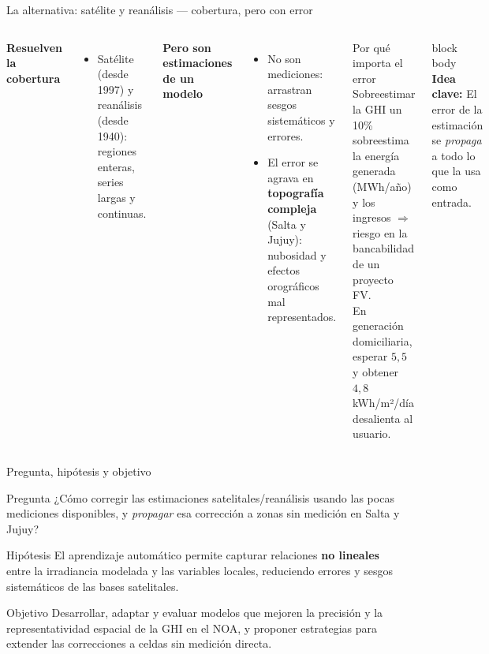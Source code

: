 \documentclass[aspectratio=169,11pt]{beamer}
\newcommand{\clave}[1]{%
  \begin{beamercolorbox}[wd=\linewidth,sep=6pt,rounded=true]{block body}%
    \footnotesize\textbf{\color{primary}Idea clave: }#1%
  \end{beamercolorbox}}
\begin{document}
\begin{frame}{La alternativa: satélite y reanálisis — cobertura, pero con error}
  \footnotesize
  \begin{columns}[T]
    \textbf{\color{teal}Resuelven la cobertura}
    \begin{itemize}
      \item Satélite (desde 1997) y reanálisis (desde 1940): regiones enteras, series largas y continuas.
    \end{itemize}
    \textbf{\color{accent}Pero son estimaciones de un modelo}
    \begin{itemize}
      \item No son mediciones: arrastran sesgos sistemáticos y errores.
      \item El error se agrava en \textbf{topografía compleja} (Salta y Jujuy): nubosidad y efectos orográficos mal representados.
    \end{itemize}
    \begin{block}{Por qué importa el error}
      \scriptsize
      Sobreestimar la GHI un 10\% sobreestima la energía generada (MWh/año) y los ingresos $\Rightarrow$ riesgo en la bancabilidad de un proyecto FV.\\[3pt]
      En generación domiciliaria, esperar $5{,}5$ y obtener $4{,}8$ kWh/m²/día desalienta al usuario.
    \end{block}
    \vspace{0.2em}
    \clave{El error de la estimación se \emph{propaga} a todo lo que la usa como entrada.}
  \end{columns}
\end{frame}

\begin{frame}{Pregunta, hipótesis y objetivo}
  \footnotesize
  \begin{block}{Pregunta}
    ¿Cómo corregir las estimaciones satelitales/reanálisis usando las pocas mediciones disponibles, y \emph{propagar} esa corrección a zonas sin medición en Salta y Jujuy?
  \end{block}
  \begin{block}{Hipótesis}
    El aprendizaje automático permite capturar relaciones \textbf{no lineales} entre la irradiancia modelada y las variables locales, reduciendo errores y sesgos sistemáticos de las bases satelitales.
  \end{block}
  \begin{block}{Objetivo}
    Desarrollar, adaptar y evaluar modelos que mejoren la precisión y la representatividad espacial de la GHI en el NOA, y proponer estrategias para extender las correcciones a celdas sin medición directa.
  \end{block}
\end{frame}
\end{document}
